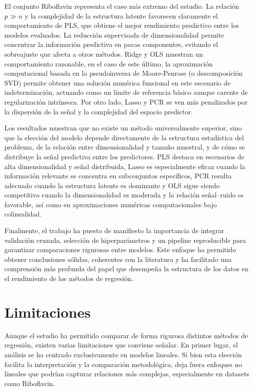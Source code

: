 \documentclass[12pt,a4paper]{report}
\begin{document}
El conjunto Riboflavin representa el caso más extremo del estudio. La relación $p \gg n$ y la complejidad de la estructura latente favorecen claramente el comportamiento de PLS, que obtiene el mejor rendimiento predictivo entre los modelos evaluados. La reducción supervisada de dimensionalidad permite concentrar la información predictiva en pocas componentes, evitando el sobreajuste que afecta a otros métodos. Ridge y OLS muestran un comportamiento razonable, en el caso de este último, la aproximación computacional basada en la pseudoinversa de Moore-Penrose (o descomposición SVD) permite obtener una solución numérica funcional en este escenario de indeterminación, actuando como un límite de referencia básico aunque carente de regularización intrínseca. Por otro lado, Lasso y PCR se ven más penalizados por la dispersión de la señal y la complejidad del espacio predictor.

Los resultados muestran que no existe un método universalmente superior, sino que la elección del modelo depende directamente de la estructura estadística del problema, de la relación entre dimensionalidad y tamaño muestral, y de cómo se distribuye la señal predictiva entre los predictores. PLS destaca en escenarios de alta dimensionalidad y señal distribuida, Lasso es especialmente eficaz cuando la información relevante se concentra en subconjuntos específicos, PCR resulta adecuado cuando la estructura latente es dominante y OLS sigue siendo competitivo cuando la dimensionalidad es moderada y la relación señal–ruido es favorable, así como en aproximaciones numéricas computacionales bajo colinealidad.

Finalmente, el trabajo ha puesto de manifiesto la importancia de integrar validación cruzada, selección de hiperparámetros y un pipeline reproducible para garantizar comparaciones rigurosas entre modelos. Este enfoque ha permitido obtener conclusiones sólidas, coherentes con la literatura y ha facilitado una comprensión más profunda del papel que desempeña la estructura de los datos en el rendimiento de los métodos de regresión.

\section{Limitaciones}

Aunque el estudio ha permitido comparar de forma rigurosa distintos métodos de regresión, existen varias limitaciones que conviene señalar. En primer lugar, el análisis se ha centrado exclusivamente en modelos lineales. Si bien esta elección facilita la interpretación y la comparación metodológica, deja fuera enfoques no lineales que podrían capturar relaciones más complejas, especialmente en datasets como Riboflavin.
\end{document}
